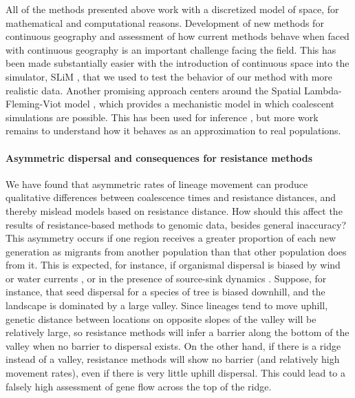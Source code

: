 \documentclass{article}
\begin{document}
All of the methods presented above work with a discretized model of space,
for mathematical and computational reasons. 
Development of new methods for continuous geography
and assessment of how current methods behave when faced with continuous geography
is an important challenge facing the field.
This has been made substantially easier with the introduction of continuous space 
into the simulator, SLiM \citep{haller2018forward},
that we used to test the behavior of our method with more realistic data.
Another promising approach centers around the Spatial Lambda-Fleming-Viot model
\citep{barton2010continuum}, 
which provides a mechanistic model in which coalescent simulations are possible.
This has been used for inference \citep{guindon2016demographic},
but more work remains to understand how it behaves as an approximation to real populations.


\paragraph{Asymmetric dispersal and consequences for resistance methods}
We have found that asymmetric rates of lineage movement
can produce qualitative differences between coalescence times and resistance distances,
and thereby mislead models based on resistance distance.
How should this affect the results of resistance-based methods to genomic data,
besides general inaccuracy?
This asymmetry occurs if one region receives a greater proportion of each new generation as migrants
from another population than that other population does from it.
This is expected, for instance,
if organismal dispersal is biased by wind or water currents \citep{gaines2003avoiding,morrissey2009maintenance},
or in the presence of source-sink dynamics \citep{dias1996sources,lenormand2002limits}.
Suppose, for instance, that seed dispersal for a species of tree
is biased downhill,
and the landscape is dominated by a large valley.
Since lineages tend to move uphill,
genetic distance between locations on opposite slopes of the valley will be relatively large,
so resistance methods will infer a barrier along the bottom of the valley
when no barrier to dispersal exists.
On the other hand, if there is a ridge instead of a valley,
resistance methods will show no barrier (and relatively high movement rates),
even if there is very little uphill dispersal.
This could lead to a falsely high assessment of gene flow across the top of the ridge.
\end{document}
